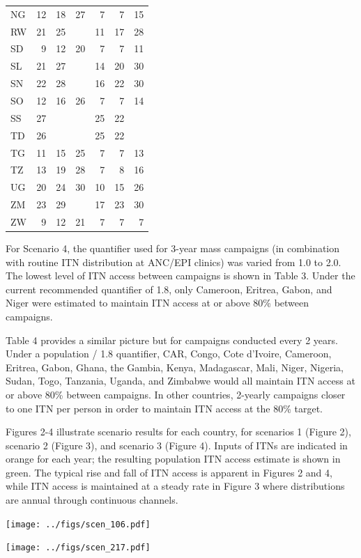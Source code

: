 \documentclass[review,
3p]{elsarticle} %
\begin{document}
\begin{longtable}{lrrrrrr}
NG & 12 & 18 & 27 & 7 & 7 & 15 \\ 
RW & 21 & 25 &  & 11 & 17 & 28 \\ 
SD & 9 & 12 & 20 & 7 & 7 & 11 \\ 
SL & 21 & 27 &  & 14 & 20 & 30 \\ 
SN & 22 & 28 &  & 16 & 22 & 30 \\ 
SO & 12 & 16 & 26 & 7 & 7 & 14 \\ 
SS & 27 &  &  & 25 & 22 &  \\ 
TD & 26 &  &  & 25 & 22 &  \\ 
TG & 11 & 15 & 25 & 7 & 7 & 13 \\ 
TZ & 13 & 19 & 28 & 7 & 8 & 16 \\ 
UG & 20 & 24 & 30 & 10 & 15 & 26 \\ 
ZM & 23 & 29 &  & 17 & 23 & 30 \\ 
ZW & 9 & 12 & 21 & 7 & 7 & 7 \\ 
\bottomrule
\end{longtable}

For Scenario 4, the quantifier used for 3-year mass campaigns (in
combination with routine ITN distribution at ANC/EPI clinics) was varied
from 1.0 to 2.0. The lowest level of ITN access between campaigns is
shown in Table 3. Under the current recommended quantifier of 1.8, only
Cameroon, Eritrea, Gabon, and Niger were estimated to maintain ITN
access at or above 80\% between campaigns.

Table 4 provides a similar picture but for campaigns conducted every 2
years. Under a population / 1.8 quantifier, CAR, Congo, Cote d'Ivoire,
Cameroon, Eritrea, Gabon, Ghana, the Gambia, Kenya, Madagascar, Mali,
Niger, Nigeria, Sudan, Togo, Tanzania, Uganda, and Zimbabwe would all
maintain ITN access at or above 80\% between campaigns. In other
countries, 2-yearly campaigns closer to one ITN per person in order to
maintain ITN access at the 80\% target.

Figures 2-4 illustrate scenario results for each country, for scenarios
1 (Figure 2), scenario 2 (Figure 3), and scenario 3 (Figure 4). Inputs
of ITNs are indicated in orange for each year; the resulting population
ITN access estimate is shown in green. The typical rise and fall of ITN
access is apparent in Figures 2 and 4, while ITN access is maintained at
a steady rate in Figure 3 where distributions are annual through
continuous channels.

\texttt{[image: ../figs/scen\_106.pdf]}

\texttt{[image: ../figs/scen\_217.pdf]}
\end{document}
